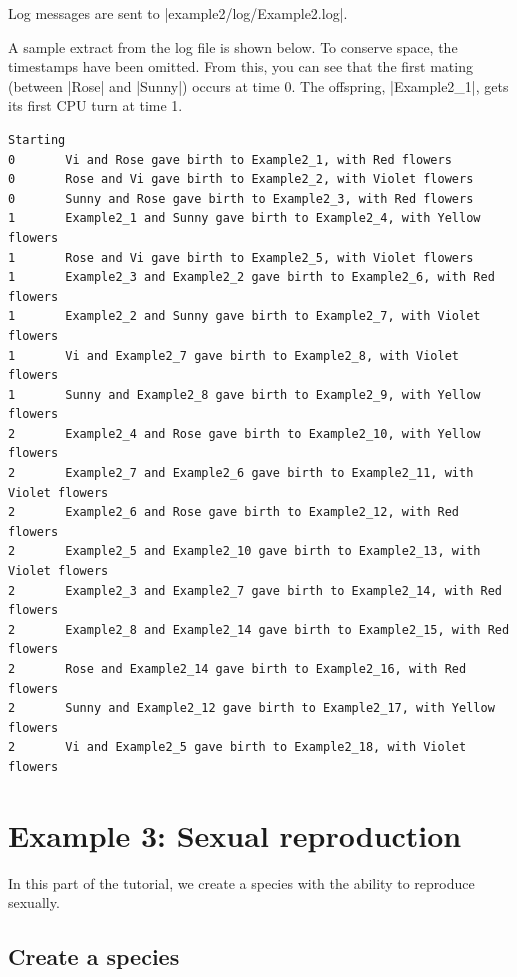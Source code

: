 \documentclass[a4paper,10pt]{article}
\begin{document}
Log messages are sent to |example2/log/Example2.log|.

A sample extract from the log file is shown below.
To conserve space, the timestamps have been omitted.
From this, you can see that the first mating (between |Rose| and |Sunny|)
occurs at time 0.
The offspring, |Example2_1|, gets its first CPU turn at time 1.

\begin{verbatim}
Starting
0       Vi and Rose gave birth to Example2_1, with Red flowers
0       Rose and Vi gave birth to Example2_2, with Violet flowers
0       Sunny and Rose gave birth to Example2_3, with Red flowers
1       Example2_1 and Sunny gave birth to Example2_4, with Yellow flowers
1       Rose and Vi gave birth to Example2_5, with Violet flowers
1       Example2_3 and Example2_2 gave birth to Example2_6, with Red flowers
1       Example2_2 and Sunny gave birth to Example2_7, with Violet flowers
1       Vi and Example2_7 gave birth to Example2_8, with Violet flowers
1       Sunny and Example2_8 gave birth to Example2_9, with Yellow flowers
2       Example2_4 and Rose gave birth to Example2_10, with Yellow flowers
2       Example2_7 and Example2_6 gave birth to Example2_11, with Violet flowers
2       Example2_6 and Rose gave birth to Example2_12, with Red flowers
2       Example2_5 and Example2_10 gave birth to Example2_13, with Violet flowers
2       Example2_3 and Example2_7 gave birth to Example2_14, with Red flowers
2       Example2_8 and Example2_14 gave birth to Example2_15, with Red flowers
2       Rose and Example2_14 gave birth to Example2_16, with Red flowers
2       Sunny and Example2_12 gave birth to Example2_17, with Yellow flowers
2       Vi and Example2_5 gave birth to Example2_18, with Violet flowers
\end{verbatim}

\section{Example 3: Sexual reproduction}
\label{sec:bug}

In this part of the tutorial, we create a species with the
ability to reproduce sexually.

\subsection{Create a species}
\label{sec:species3}


\end{document}
